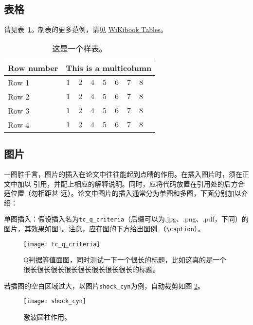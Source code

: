 \subsection{表格}

请见表~\ref{tab:sample}。制表的更多范例，请见
\href{https://en.wikibooks.org/wiki/LaTeX/Tables}{WiKibook Tables}。
\begin{table}[!htbp]
    \caption[样表]{这是一个样表。}
    \label{tab:sample}
    \centering
    \footnotesize%
    \setlength{\tabcolsep}{4pt}%
    \renewcommand{\arraystretch}{1.2}%
    \begin{tabular}{lcccccccc}
        \hline
        Row number & \multicolumn{8}{c}{This is a multicolumn} \\
        \hline
        Row 1 & $1$ & $2$ & $4$ & $5$ & $6$ & $7$ & $8$\\
        Row 2 & $1$ & $2$ & $4$ & $5$ & $6$ & $7$ & $8$\\
        Row 3 & $1$ & $2$ & $4$ & $5$ & $6$ & $7$ & $8$\\
        Row 4 & $1$ & $2$ & $4$ & $5$ & $6$ & $7$ & $8$\\
        \hline
    \end{tabular}
\end{table}

\subsection{图片}

一图胜千言，图片的插入在论文中往往能起到点睛的作用。在插入图片时，须在正文中加以
引用，并配上相应的解释说明。同时，应将代码放置在引用处的后方合适位置（勿相距甚
远）。论文中图片的插入通常分为单图和多图，下面分别加以介绍：

单图插入：假设插入名为\verb|tc_q_criteria|（后缀可以为.jpg、.png、.pdf，下同）的
图片，其效果如图\ref{fig:tc_q_criteria}。注意，应在图的下方给出图例
（\verb|\caption|）。
\begin{figure}[!htbp]
    \centering
    \texttt{[image: tc\_q\_criteria]}
    \caption[Q判据等值面图]{Q判据等值面图，同时测试一下一个很长的标题，比如这真的是一个很长很长很长很长很长很长很长很长的标题。}
    \label{fig:tc_q_criteria}
\end{figure}

若插图的空白区域过大，以图片\verb|shock_cyn|为例，自动裁剪如图
\ref{fig:shock_cyn}。
\begin{figure}[!htbp]
    \centering
    \texttt{[image: shock\_cyn]}
    \caption[激波圆柱作用]{激波圆柱作用。}
    \label{fig:shock_cyn}
\end{figure}

